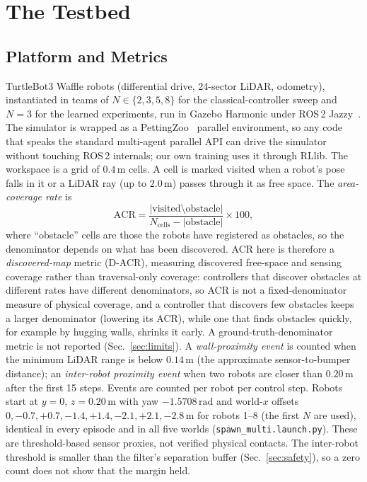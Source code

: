 \documentclass[conference]{IEEEtran}
\newcommand{\si}[1]{\mathrm{#1}}
\begin{document}
\section{The Testbed}
\label{sec:testbed}
\subsection{Platform and Metrics}
TurtleBot3 Waffle robots (differential drive, 24-sector LiDAR, odometry), instantiated in teams of $N\in\{2,3,5,8\}$ for the classical-controller sweep and $N=3$ for the learned experiments,
run in Gazebo Harmonic under ROS\,2 Jazzy~\cite{macenski2022ros2,gazebo}. The
simulator is wrapped as a PettingZoo~\cite{terry2021pettingzoo} parallel
environment, so any code that speaks the standard multi-agent parallel API can drive the simulator without touching ROS\,2 internals; our own training uses it through RLlib. The workspace is a grid of $0.4\,\si{m}$ cells. A cell is marked
visited when a robot's pose falls in it or a LiDAR ray (up to $2.0\,\si{m}$)
passes through it as free space. The \emph{area-coverage rate} is
\begin{equation}
\mathrm{ACR}=\frac{|\text{visited}\setminus\text{obstacle}|}
{N_{\text{cells}}-|\text{obstacle}|}\times100,
\end{equation}
where ``obstacle'' cells are those the robots have registered as obstacles, so
the denominator depends on what has been discovered. ACR here is therefore a \emph{discovered-map} metric (D-ACR), measuring discovered free-space and sensing coverage rather than traversal-only coverage: controllers that discover obstacles at different rates have different denominators, so ACR is not a fixed-denominator measure of physical coverage, and a controller that discovers few obstacles keeps a larger denominator (lowering its ACR), while one that finds obstacles quickly, for example by hugging walls, shrinks it early. A ground-truth-denominator metric is not reported (Sec.~\ref{sec:limits}). A \emph{wall-proximity event} is
counted when the minimum LiDAR range is below $0.14\,\si{m}$ (the approximate
sensor-to-bumper distance); an \emph{inter-robot proximity event} when two robots are closer
than $0.20\,\si{m}$ after the first 15 steps. Events are counted per robot per control step. Robots start at $y=0$, $z=0.20\,\si{m}$ with yaw $-1.5708\,\si{rad}$ and world-$x$ offsets $0,-0.7,+0.7,-1.4,+1.4,-2.1,+2.1,-2.8\,\si{m}$ for robots 1--8 (the first $N$ are used), identical in every episode and in all five worlds (\texttt{spawn\_multi.launch.py}). These are threshold-based sensor proxies, not verified physical contacts. The inter-robot threshold is
smaller than the filter's separation buffer (Sec.~\ref{sec:safety}), so a zero count
does not show that the margin held.
\end{document}
